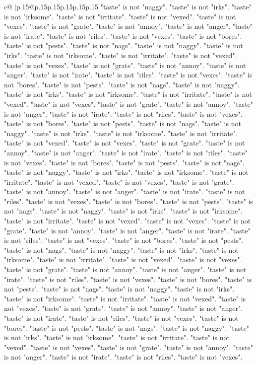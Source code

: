 \documentclass{article}
\begin{document}
{\begin{supertabular}{c@{$\;$}|p{.15\linewidth}@{}p{.15\linewidth}p{.15\linewidth}p{.15\linewidth}p{.15\linewidth}p{.15\linewidth}}
{{{"taste" is not "naggy". "taste" is not "irks". "taste" is not "irksome". "taste" is not "irritate". "taste" is not "vexed". "taste" is not "vexes". "taste" is not "grate". "taste" is not "annoy". "taste" is not "anger". "taste" is not "irate". "taste" is not "riles". "taste" is not "vexes". "taste" is not "bores". "taste" is not "pests". "taste" is not "nags". "taste" is not "naggy". "taste" is not "irks". "taste" is not "irksome". "taste" is not "irritate". "taste" is not "vexed". "taste" is not "vexes". "taste" is not "grate". "taste" is not "annoy". "taste" is not "anger". "taste" is not "irate". "taste" is not "riles". "taste" is not "vexes". "taste" is not "bores". "taste" is not "pests". "taste" is not "nags". "taste" is not "naggy". "taste" is not "irks". "taste" is not "irksome". "taste" is not "irritate". "taste" is not "vexed". "taste" is not "vexes". "taste" is not "grate". "taste" is not "annoy". "taste" is not "anger". "taste" is not "irate". "taste" is not "riles". "taste" is not "vexes". "taste" is not "bores". "taste" is not "pests". "taste" is not "nags". "taste" is not "naggy". "taste" is not "irks". "taste" is not "irksome". "taste" is not "irritate". "taste" is not "vexed". "taste" is not "vexes". "taste" is not "grate". "taste" is not "annoy". "taste" is not "anger". "taste" is not "irate". "taste" is not "riles". "taste" is not "vexes". "taste" is not "bores". "taste" is not "pests". "taste" is not "nags". "taste" is not "naggy". "taste" is not "irks". "taste" is not "irksome". "taste" is not "irritate". "taste" is not "vexed". "taste" is not "vexes". "taste" is not "grate". "taste" is not "annoy". "taste" is not "anger". "taste" is not "irate". "taste" is not "riles". "taste" is not "vexes". "taste" is not "bores". "taste" is not "pests". "taste" is not "nags". "taste" is not "naggy". "taste" is not "irks". "taste" is not "irksome". "taste" is not "irritate". "taste" is not "vexed". "taste" is not "vexes". "taste" is not "grate". "taste" is not "annoy". "taste" is not "anger". "taste" is not "irate". "taste" is not "riles". "taste" is not "vexes". "taste" is not "bores". "taste" is not "pests". "taste" is not "nags". "taste" is not "naggy". "taste" is not "irks". "taste" is not "irksome". "taste" is not "irritate". "taste" is not "vexed". "taste" is not "vexes". "taste" is not "grate". "taste" is not "annoy". "taste" is not "anger". "taste" is not "irate". "taste" is not "riles". "taste" is not "vexes". "taste" is not "bores". "taste" is not "pests". "taste" is not "nags". "taste" is not "naggy". "taste" is not "irks". "taste" is not "irksome". "taste" is not "irritate". "taste" is not "vexed". "taste" is not "vexes". "taste" is not "grate". "taste" is not "annoy". "taste" is not "anger". "taste" is not "irate". "taste" is not "riles". "taste" is not "vexes". "taste" is not "bores". "taste" is not "pests". "taste" is not "nags". "taste" is not "naggy". "taste" is not "irks". "taste" is not "irksome". "taste" is not "irritate". "taste" is not "vexed". "taste" is not "vexes". "taste" is not "grate". "taste" is not "annoy". "taste" is not "anger". "taste" is not "irate". "taste" is not "riles". "taste" is not "vexes". }}}
\end{supertabular}}
\end{document}
